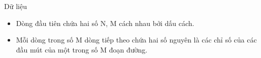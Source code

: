 Dữ liệu  
\begin{itemize}
	\item     Dòng đầu tiên chứa hai số N, M cách nhau bởi dấu cách.   
	\item     Mỗi dòng trong số M dòng tiếp theo chứa hai số nguyên là các chỉ số của các đầu mút của một trong số M đoạn đường.   
\end{itemize}